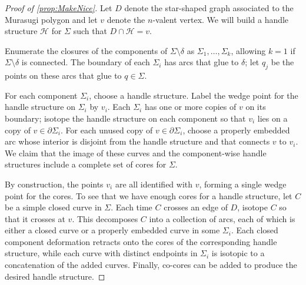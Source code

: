 \documentclass[10pt,a4paper]{amsart}
\def\H{\mathcal{H}}
\begin{document}
\begin{proof}[Proof of \ref{prop:MakeNice}]
Let  $D$ denote the star-shaped graph associated to the Murasugi polygon and let $v$ denote the $n$-valent vertex.   We will build a handle structure $\H$ for $\Sigma$ such that   $D\cap\H=v$. 
    
    Enumerate the closures of the components of $\Sigma\setminus\delta$  as $\Sigma_{1},\dots,\Sigma_{k}$, allowing $k=1$ if $\Sigma\setminus\delta$ is  connected. The boundary of each $\Sigma_{i}$ has arcs that glue to $\delta$; let $q_j$ be the points on these arcs that glue to $q\in\Sigma$.
    
   For each component $\Sigma_i$, choose a handle structure.  Label the wedge point for the handle structure on $\Sigma_i$  by $v_i$.  Each $\Sigma_i$ has one or more copies of $v$ on its boundary; isotope the handle structure on each component so that $v_i$ lies on a copy of $v\in \partial \Sigma_i$.  For each unused copy of $v\in \partial \Sigma_i$, choose a properly embedded arc whose interior is disjoint from the handle structure and that connects $v$ to $v_i$.  We claim that the image of these curves and the component-wise handle structures include a complete set of cores for $\Sigma$.
      
 By construction, the points $v_i$ are all identified with $v$, forming a single wedge point for the cores.  To see that we have enough cores for a handle structure, let $C$ be a simple closed curve in $\Sigma$.  Each time $C$ crosses an edge of $D$, isotope $C$ so that it crosses at $v$.  This decomposes $C$ into a collection of arcs, each of which is either a closed curve or a properly embedded curve in some $\Sigma_i$.  Each closed component deformation retracts onto the cores of the corresponding handle structure, while each curve with distinct endpoints in $\Sigma_i$ is isotopic to a concatenation of the added curves.  Finally, co-cores can be added to produce the desired handle structure.  
 \end{proof}
\end{document}
